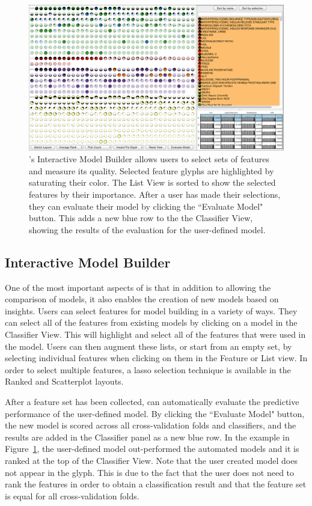 \begin{figure}[t]
\centering
\includegraphics[width=\linewidth]{infuse/selection}
\caption[\infuse's Interactive Model Builder.]{
\infuse's Interactive Model Builder allows users to select sets of features and measure its quality.
Selected feature glyphs are highlighted by saturating their color.  The List View is sorted to show the selected features by their importance.  After a user has made their selections, they can evaluate their model by clicking the ``Evaluate Model" button.  This adds a new blue row to the the Classifier View, showing the results of the evaluation for the user-defined model.
}
\label{fig:selection}
\end{figure}

\subsection{Interactive Model Builder}
\label{sec:imb}

One of the most important aspects of \infuse is that in addition to allowing the comparison of models, it also enables the creation of new models based on insights.
Users can select features for model building in a variety of ways.  They can select all of the features from existing models by clicking on a model in the Classifier View.  This will highlight and select all of the features that were used in the model.  Users can then augment these lists, or start from an empty set, by selecting individual features when clicking on them in the Feature or List view.  In order to select multiple features, a lasso selection technique is available in the Ranked and Scatterplot layouts.

After a feature set has been collected, \infuse can automatically evaluate the predictive performance of the user-defined model. By clicking the ``Evaluate Model" button,
the new model is scored across all cross-validation folds and classifiers, and the results are added in the Classifier panel as a new blue row.  In the example in Figure~\ref{fig:selection}, the user-defined model out-performed the automated models and it is ranked at the top of the Classifier View.
Note that the user created model does not appear in the glyph.
This is due to the fact that the user does not need to rank the
features in order to obtain a classification result and that the feature
set is equal for all cross-validation folds.


